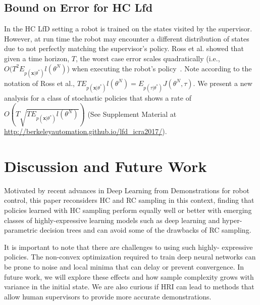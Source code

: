 \documentclass[10pt, conference]{ieeeconf}      %
\newcommand{\bx}{\mathbf{x}}
\begin{document}
\subsection{Bound on Error for HC Lfd}
In the HC LfD setting a robot is trained on the states visited by the supervisor. However, at run time the robot may encounter a different distribution of states due to not perfectly matching the supervisor's policy. Ross et al. showed that given a time horizon, $T$, the worst case error scales quadratically (i.e., $O(T^2E_{p(\bx|\theta^*)} l(\theta^N)$) when executing the robot's policy~\cite{ross2010efficient}. Note according to the notation of Ross et al., $TE_{p(\bx|\theta^*)} l(\theta^N) = E_{p(\tau|\theta^*)} J(\theta^N, \tau)$. We present a new analysis for a class of stochastic policies that shows a rate of $O(T\sqrt{TE_{p(\bx|\theta^*)} l(\theta^N)})$ (See Supplement Material at \url{http://berkeleyautomation.github.io/lfd_icra2017/}).  


\section{Discussion and Future Work}

Motivated by recent advances in Deep Learning from Demonstrations for robot control, this paper reconsiders HC and RC sampling in this context, finding that policies learned with HC sampling perform equally well or better with emerging classes of highly-expressive learning models such as deep learning and hyper-parametric decision trees and can avoid some of the drawbacks of RC sampling.  

It is important to note that there are challenges to using such highly- expressive policies. The non-convex optimization required to train deep neural networks can be prone to noise and local minima that can delay or prevent convergence.  In future work, we will explore these effects and how sample complexity grows with variance in the initial state. We are also curious if HRI can lead to methods that allow human supervisors to provide more accurate demonstrations.  






\end{document}
